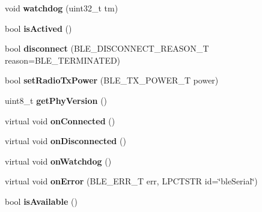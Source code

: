 \begin{DoxyCompactItemize}
\item 
\hypertarget{classble_serial_a2588b21bf80d35a866dc7e47f97142df}{void {\bfseries watchdog} (uint32\-\_\-t tm)}\label{classble_serial_a2588b21bf80d35a866dc7e47f97142df}

\item 
\hypertarget{classble_serial_ab766015c18f219e359edc1c560d66893}{bool {\bfseries is\-Actived} ()}\label{classble_serial_ab766015c18f219e359edc1c560d66893}

\item 
\hypertarget{classble_serial_a5e63823fd7ff0ef0ac5447cd265b5a5c}{bool {\bfseries disconnect} (B\-L\-E\-\_\-\-D\-I\-S\-C\-O\-N\-N\-E\-C\-T\-\_\-\-R\-E\-A\-S\-O\-N\-\_\-\-T reason=B\-L\-E\-\_\-\-T\-E\-R\-M\-I\-N\-A\-T\-E\-D)}\label{classble_serial_a5e63823fd7ff0ef0ac5447cd265b5a5c}

\item 
\hypertarget{classble_serial_acddad359ad714bd31358c96966839a61}{bool {\bfseries set\-Radio\-Tx\-Power} (B\-L\-E\-\_\-\-T\-X\-\_\-\-P\-O\-W\-E\-R\-\_\-\-T power)}\label{classble_serial_acddad359ad714bd31358c96966839a61}

\item 
\hypertarget{classble_serial_a6aea16b265aa98f0a540f71b75965408}{uint8\-\_\-t {\bfseries get\-Phy\-Version} ()}\label{classble_serial_a6aea16b265aa98f0a540f71b75965408}

\item 
\hypertarget{classble_serial_adb930ce55295ff7eb6ab5bdbeb702749}{virtual void {\bfseries on\-Connected} ()}\label{classble_serial_adb930ce55295ff7eb6ab5bdbeb702749}

\item 
\hypertarget{classble_serial_aa6f5116c8bcf05011a05ad5e2967c318}{virtual void {\bfseries on\-Disconnected} ()}\label{classble_serial_aa6f5116c8bcf05011a05ad5e2967c318}

\item 
\hypertarget{classble_serial_a8af315789cc459a1fde96ac80ca9ffb7}{virtual void {\bfseries on\-Watchdog} ()}\label{classble_serial_a8af315789cc459a1fde96ac80ca9ffb7}

\item 
\hypertarget{classble_serial_a8a0622f5d10fe2242978a16b2d1e6ee4}{virtual void {\bfseries on\-Error} (B\-L\-E\-\_\-\-E\-R\-R\-\_\-\-T err, L\-P\-C\-T\-S\-T\-R id=\char`\"{}ble\-Serial\char`\"{})}\label{classble_serial_a8a0622f5d10fe2242978a16b2d1e6ee4}

\item 
\hypertarget{classble_serial_a1691c5c5655043512bf1c462e6928488}{bool {\bfseries is\-Available} ()}\label{classble_serial_a1691c5c5655043512bf1c462e6928488}


\end{DoxyCompactItemize}
